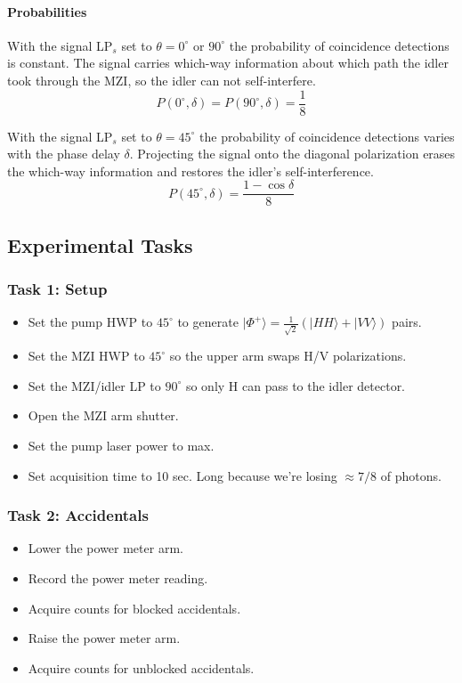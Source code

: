 \documentclass{article}
\begin{document}
\paragraph{Probabilities}

With the signal LP$_s$ set to $\theta=0^\circ$ or $90^\circ$ the probability of
coincidence detections is constant.
The signal carries which-way information about which path the idler took
through the MZI, so the idler can not self-interfere.
\[
P(0^\circ, \delta)=P(90^\circ, \delta)=\frac{1}{8}
\]

With the signal LP$_s$ set to $\theta=45^\circ$ the probability of
coincidence detections varies with the phase delay $\delta$.
Projecting the signal onto the diagonal polarization erases the
which-way information and restores the idler's self-interference.
\[
P(45^\circ, \delta)=\frac{1-\cos\delta}{8}
\]

\subsection*{Experimental Tasks}

\subsubsection*{Task 1: Setup}

\begin{itemize}
\item Set the pump HWP to $45^\circ$ to generate $| \Phi^+ \rangle = \frac{1}{\sqrt2}(|HH\rangle + |VV\rangle)$ pairs.
\item Set the MZI HWP to $45^\circ$ so the upper arm swaps H/V polarizations.
\item Set the MZI/idler LP to $90^\circ$ so only H can pass to the idler detector.
\item Open the MZI arm shutter.
\item Set the pump laser power to max.
\item Set acquisition time to 10 sec. Long because we're losing $\approx 7/8$ of photons.
\end{itemize}

\subsubsection*{Task 2: Accidentals}

\begin{itemize}
\item Lower the power meter arm.
\item Record the power meter reading.
\item Acquire counts for blocked accidentals.
\item Raise the power meter arm.
\item Acquire counts for unblocked accidentals.
\end{itemize}
\end{document}

